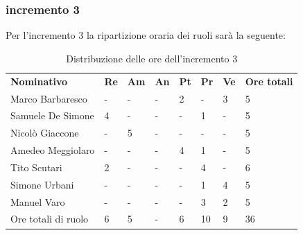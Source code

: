 \subsubsection{incremento 3}
Per l'incremento 3 la ripartizione oraria dei ruoli sarà la seguente:
\begin{center}
    \begin{table}[ht!]
        \centering
        \caption{Distribuzione delle ore dell'incremento 3}
        \vspace{5px}
        \renewcommand{\arraystretch}{1.8}
        \begin{tabular}{p{100px} p{20px} p{20px} p{20px} p{20px} p{20px} p{20px} p{50px} }
            \rowcolor{logo!70} \textbf{Nominativo} & \textbf{Re} & \textbf{Am} & \textbf{An} & \textbf{Pt} & \textbf{Pr} & \textbf{Ve} & \textbf{Ore totali} \\
            Marco Barbaresco                       & -           & -           & -           & 2           & -           & 3           & 5                   \\
            Samuele De Simone                      & 4           & -           & -           & -           & 1           & -           & 5                   \\
            Nicolò Giaccone                        & -           & 5           & -           & -           & -           & -           & 5                   \\
            Amedeo Meggiolaro                      & -           & -           & -           & 4           & 1           & -           & 5                   \\
            Tito Scutari                           & 2           & -           & -           & -           & 4           & -           & 6                   \\
            Simone Urbani                          & -           & -           & -           & -           & 1           & 4           & 5                   \\
            Manuel Varo                            & -           & -           & -           & -           & 3           & 2           & 5                   \\
            Ore totali di ruolo                    & 6           & 5           & -           & 6           & 10          & 9           & 36                  \\
        \end{tabular}
    \end{table}
\end{center}

